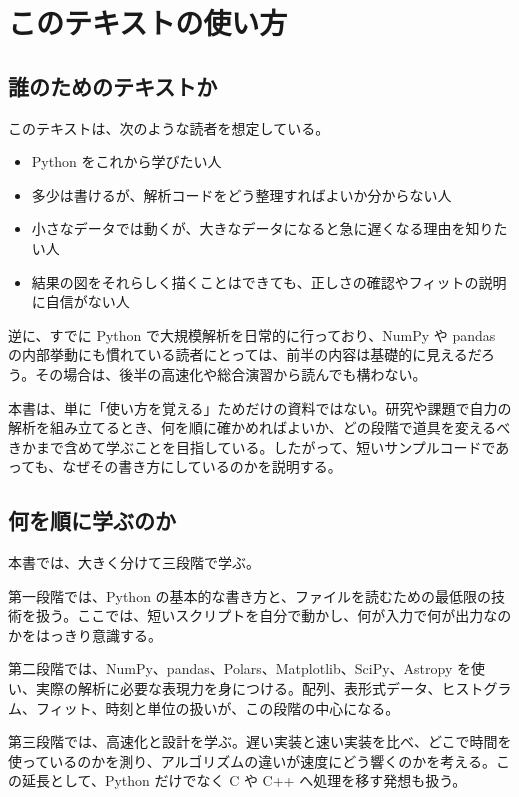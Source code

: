 \chapter{このテキストの使い方}

\section{誰のためのテキストか}

このテキストは、次のような読者を想定している。

\begin{itemize}
\item Python をこれから学びたい人
\item 多少は書けるが、解析コードをどう整理すればよいか分からない人
\item 小さなデータでは動くが、大きなデータになると急に遅くなる理由を知りたい人
\item 結果の図をそれらしく描くことはできても、正しさの確認やフィットの説明に自信がない人
\end{itemize}

逆に、すでに Python で大規模解析を日常的に行っており、NumPy や pandas の内部挙動にも慣れている読者にとっては、前半の内容は基礎的に見えるだろう。その場合は、後半の高速化や総合演習から読んでも構わない。

本書は、単に「使い方を覚える」ためだけの資料ではない。研究や課題で自力の解析を組み立てるとき、何を順に確かめればよいか、どの段階で道具を変えるべきかまで含めて学ぶことを目指している。したがって、短いサンプルコードであっても、なぜその書き方にしているのかを説明する。

\section{何を順に学ぶのか}

本書では、大きく分けて三段階で学ぶ。

第一段階では、Python の基本的な書き方と、ファイルを読むための最低限の技術を扱う。ここでは、短いスクリプトを自分で動かし、何が入力で何が出力なのかをはっきり意識する。

第二段階では、NumPy、pandas、Polars、Matplotlib、SciPy、Astropy を使い、実際の解析に必要な表現力を身につける。配列、表形式データ、ヒストグラム、フィット、時刻と単位の扱いが、この段階の中心になる。

第三段階では、高速化と設計を学ぶ。遅い実装と速い実装を比べ、どこで時間を使っているのかを測り、アルゴリズムの違いが速度にどう響くのかを考える。この延長として、Python だけでなく C や C++ へ処理を移す発想も扱う。


